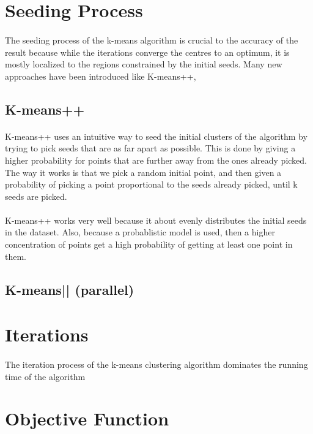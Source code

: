 \documentclass[12pt]{dalthesis}
\begin{document}
\section{Seeding Process}
\paragraph{}
The seeding process of the k-means algorithm is crucial to the accuracy of the result because while the iterations converge the centres to an optimum, it is mostly localized to the regions constrained by the initial seeds\cite{arthur2007k}.
Many new approaches have been introduced like K-means++\cite{arthur2007k},
\subsection{K-means++}
\paragraph{}
K-means++ uses an intuitive way to seed the initial clusters of the algorithm by trying to pick seeds that are as far apart as possible. This is done by giving a higher probability for points that are further away from the ones already picked. The way it works is that we pick a random initial point, and then given a probability of picking a point proportional to the seeds already picked, until k seeds are picked. 
\paragraph{}
K-means++ works very well because it about evenly distributes the initial seeds in the dataset. Also, because a probablistic model is used, then a higher concentration of points get a high probability of getting at least one point in them.
\subsection{K-means|| (parallel)}
\section{Iterations}
\paragraph{}
The iteration process of the k-means clustering algorithm dominates the running time of the algorithm 

\section{Objective Function}
\end{document}
